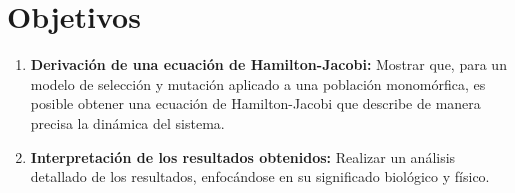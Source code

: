 \section*{Objetivos}

\begin{enumerate}
    \item \textbf{Derivación de una ecuación de Hamilton-Jacobi:}  
    Mostrar que, para un modelo de selección y mutación aplicado a una población monomórfica, es posible obtener una ecuación de Hamilton-Jacobi que describe de manera precisa la dinámica del sistema.

    \item \textbf{Interpretación de los resultados obtenidos:}  
    Realizar un análisis detallado de los resultados, enfocándose en su significado biológico y físico.
\end{enumerate}